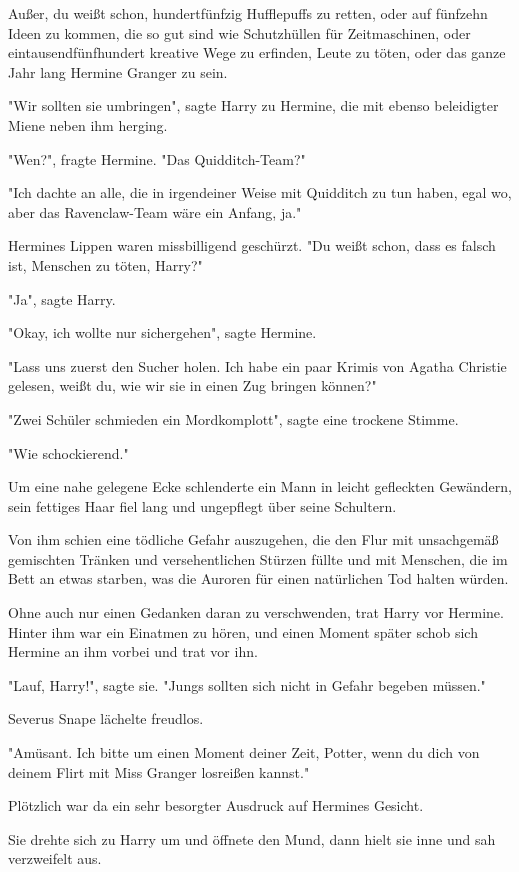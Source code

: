 {Außer, du weißt schon, hundertfünfzig Hufflepuffs zu retten, oder auf fünfzehn Ideen zu kommen, die so gut sind wie Schutzhüllen für Zeitmaschinen, oder eintausendfünfhundert kreative Wege zu erfinden, Leute zu töten, oder das ganze Jahr lang Hermine Granger zu sein.

"Wir sollten sie umbringen", sagte Harry zu Hermine, die mit ebenso beleidigter Miene neben ihm herging.

"Wen?", fragte Hermine. "Das Quidditch-Team?"

"Ich dachte an alle, die in irgendeiner Weise mit Quidditch zu tun haben, egal wo, aber das Ravenclaw-Team wäre ein Anfang, ja."

Hermines Lippen waren missbilligend geschürzt. "Du weißt schon, dass es falsch ist, Menschen zu töten, Harry?"

"Ja", sagte Harry.

"Okay, ich wollte nur sichergehen", sagte Hermine.

"Lass uns zuerst den Sucher holen. Ich habe ein paar Krimis von Agatha Christie gelesen, weißt du, wie wir sie in einen Zug bringen können?"

"Zwei Schüler schmieden ein Mordkomplott", sagte eine trockene Stimme.

"Wie schockierend."

Um eine nahe gelegene Ecke schlenderte ein Mann in leicht gefleckten Gewändern, sein fettiges Haar fiel lang und ungepflegt über seine Schultern.

Von ihm schien eine tödliche Gefahr auszugehen, die den Flur mit unsachgemäß gemischten Tränken und versehentlichen Stürzen füllte und mit Menschen, die im Bett an etwas starben, was die Auroren für einen natürlichen Tod halten würden.

Ohne auch nur einen Gedanken daran zu verschwenden, trat Harry vor Hermine. Hinter ihm war ein Einatmen zu hören, und einen Moment später schob sich Hermine an ihm vorbei und trat vor ihn.

"Lauf, Harry!", sagte sie. "Jungs sollten sich nicht in Gefahr begeben müssen."

Severus Snape lächelte freudlos.

"Amüsant. Ich bitte um einen Moment deiner Zeit, Potter, wenn du dich von deinem Flirt mit Miss Granger losreißen kannst."

Plötzlich war da ein sehr besorgter Ausdruck auf Hermines Gesicht.

Sie drehte sich zu Harry um und öffnete den Mund, dann hielt sie inne und sah verzweifelt aus.

}

